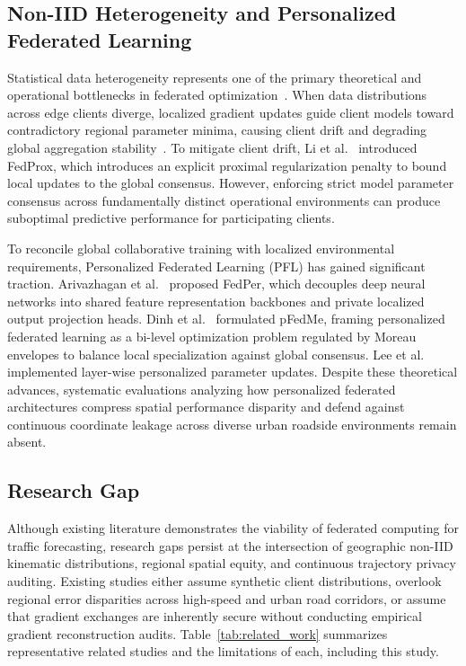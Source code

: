 \documentclass[journal]{IEEEtran}
\begin{document}
\subsection{Non-IID Heterogeneity and Personalized Federated Learning}
Statistical data heterogeneity represents one of the primary theoretical and operational bottlenecks in federated optimization~\cite{li2020federated}. When data distributions across edge clients diverge, localized gradient updates guide client models toward contradictory regional parameter minima, causing client drift and degrading global aggregation stability~\cite{mcmahan2017communication,li2020federated}. To mitigate client drift, Li et al.~\cite{li2020federated} introduced FedProx, which introduces an explicit proximal regularization penalty to bound local updates to the global consensus. However, enforcing strict model parameter consensus across fundamentally distinct operational environments can produce suboptimal predictive performance for participating clients.

To reconcile global collaborative training with localized environmental requirements, Personalized Federated Learning (PFL) has gained significant traction. Arivazhagan et al.~\cite{arivazhagan2019federated} proposed FedPer, which decouples deep neural networks into shared feature representation backbones and private localized output projection heads. Dinh et al.~\cite{dinh2020personalized} formulated pFedMe, framing personalized federated learning as a bi-level optimization problem regulated by Moreau envelopes to balance local specialization against global consensus. Lee et al.~\cite{lee2024layerwise} implemented layer-wise personalized parameter updates. Despite these theoretical advances, systematic evaluations analyzing how personalized federated architectures compress spatial performance disparity and defend against continuous coordinate leakage across diverse urban roadside environments remain absent.

\subsection{Research Gap}
Although existing literature demonstrates the viability of federated computing for traffic forecasting, research gaps persist at the intersection of geographic non-IID kinematic distributions, regional spatial equity, and continuous trajectory privacy auditing. Existing studies either assume synthetic client distributions, overlook regional error disparities across high-speed and urban road corridors, or assume that gradient exchanges are inherently secure without conducting empirical gradient reconstruction audits. Table~\ref{tab:related_work} summarizes representative related studies and the limitations of each, including this study.
\end{document}
